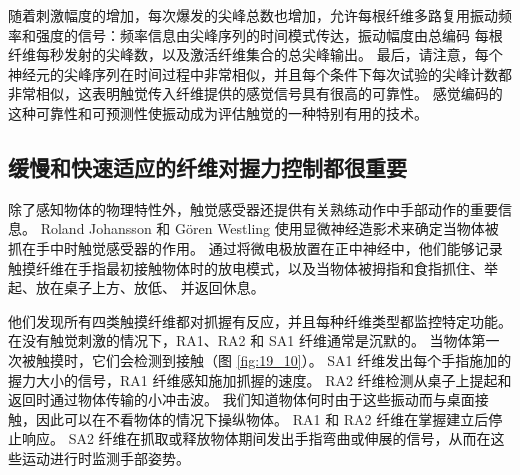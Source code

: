 随着刺激幅度的增加，每次爆发的尖峰总数也增加，允许每根纤维多路复用振动频率和强度的信号：频率信息由尖峰序列的时间模式传达，振动幅度由总编码 每根纤维每秒发射的尖峰数，以及激活纤维集合的总尖峰输出。 
最后，请注意，每个神经元的尖峰序列在时间过程中非常相似，并且每个条件下每次试验的尖峰计数都非常相似，这表明触觉传入纤维提供的感觉信号具有很高的可靠性。 
感觉编码的这种可靠性和可预测性使振动成为评估触觉的一种特别有用的技术。


\subsection{缓慢和快速适应的纤维对握力控制都很重要}
除了感知物体的物理特性外，触觉感受器还提供有关熟练动作中手部动作的重要信息。 
Roland Johansson 和 Gören Westling 使用显微神经造影术来确定当物体被抓在手中时触觉感受器的作用。 
通过将微电极放置在正中神经中，他们能够记录触摸纤维在手指最初接触物体时的放电模式，以及当物体被拇指和食指抓住、举起、放在桌子上方、放低、 并返回休息。


他们发现所有四类触摸纤维都对抓握有反应，并且每种纤维类型都监控特定功能。 
在没有触觉刺激的情况下，RA1、RA2 和 SA1 纤维通常是沉默的。 
当物体第一次被触摸时，它们会检测到接触（图 \ref{fig:19_10}）。 
SA1 纤维发出每个手指施加的握力大小的信号，RA1 纤维感知施加抓握的速度。 
RA2 纤维检测从桌子上提起和返回时通过物体传输的小冲击波。 
我们知道物体何时由于这些振动而与桌面接触，因此可以在不看物体的情况下操纵物体。 
RA1 和 RA2 纤维在掌握建立后停止响应。 
SA2 纤维在抓取或释放物体期间发出手指弯曲或伸展的信号，从而在这些运动进行时监测手部姿势。

